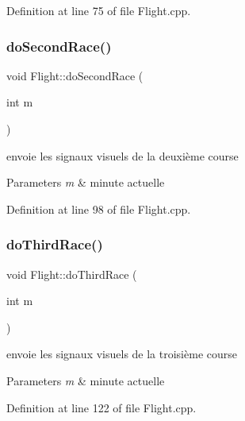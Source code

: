 Definition at line 75 of file Flight.\+cpp.

\mbox{\label{class_flight_a678e5da38ff7b0a9f2c605167e90a2a6}} 
\subsubsection{\texorpdfstring{do\+Second\+Race()}{doSecondRace()}}
{\footnotesize\ttfamily void Flight\+::do\+Second\+Race (\begin{DoxyParamCaption}\item[{int}]{m }\end{DoxyParamCaption})}



envoie les signaux visuels de la deuxième course 


\begin{DoxyParams}{Parameters}
{\em m} & minute actuelle \\
\hline
\end{DoxyParams}


Definition at line 98 of file Flight.\+cpp.

\mbox{\label{class_flight_a046562fcc923af19322ef74dea295809}} 
\subsubsection{\texorpdfstring{do\+Third\+Race()}{doThirdRace()}}
{\footnotesize\ttfamily void Flight\+::do\+Third\+Race (\begin{DoxyParamCaption}\item[{int}]{m }\end{DoxyParamCaption})}



envoie les signaux visuels de la troisième course 


\begin{DoxyParams}{Parameters}
{\em m} & minute actuelle \\
\hline
\end{DoxyParams}


Definition at line 122 of file Flight.\+cpp.

\mbox{\label{class_flight_ac5fc14dc02d9a75a00ce6688003e8842}} 
